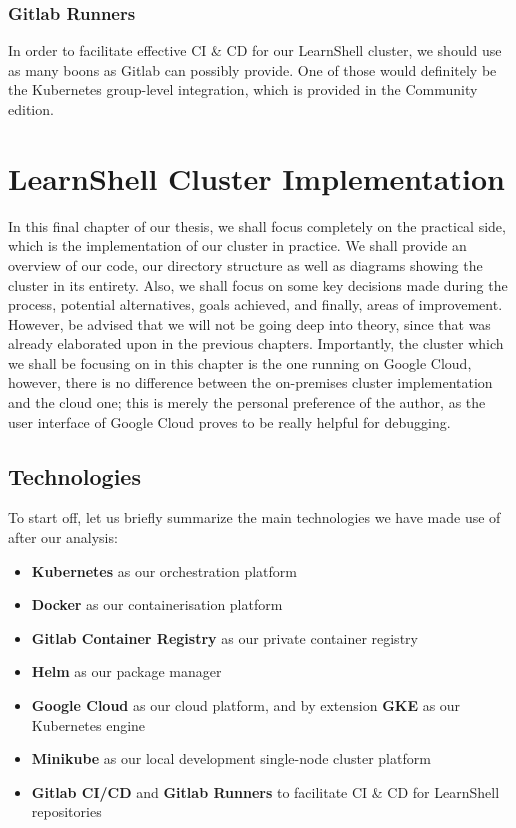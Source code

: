 \documentclass[thesis=B,english]{FITthesis}[2019/12/23]
\begin{document}
\subsection{Gitlab Runners}

In order to facilitate effective CI \& CD for our LearnShell cluster, we should use as many boons as Gitlab can possibly provide. One of those would definitely be the Kubernetes group-level integration, which is provided in the Community edition. 





\chapter{LearnShell Cluster Implementation}

In this final chapter of our thesis, we shall focus completely on the practical side, which is the implementation of our cluster in practice. We shall provide an overview of our code, our directory structure as well as diagrams showing the cluster in its entirety. Also, we shall focus on some key decisions made during the process, potential alternatives, goals achieved, and finally, areas of improvement. However, be advised that we will not be going deep into theory, since that was already elaborated upon in the previous chapters.
\newline
Importantly, the cluster which we shall be focusing on in this chapter is the one running on Google Cloud, however, there is no difference between the on-premises cluster implementation and the cloud one; this is merely the personal preference of the author, as the user interface of Google Cloud proves to be really helpful for debugging. 

\section{Technologies}

To start off, let us briefly summarize the main technologies we have made use of after our analysis:

\begin{itemize}
  \setlength\itemsep{0em}
  \item \textbf{Kubernetes} as our orchestration platform
  \item \textbf{Docker} as our containerisation platform
  \item \textbf{Gitlab Container Registry} as our private container registry
  \item \textbf{Helm} as our package manager
  \item \textbf{Google Cloud} as our cloud platform, and by extension \textbf{GKE} as our Kubernetes engine
  \item \textbf{Minikube} as our local development single-node cluster platform
  \item \textbf{Gitlab CI/CD} and \textbf{Gitlab Runners} to facilitate CI \& CD for LearnShell repositories
\end{itemize}
\end{document}
